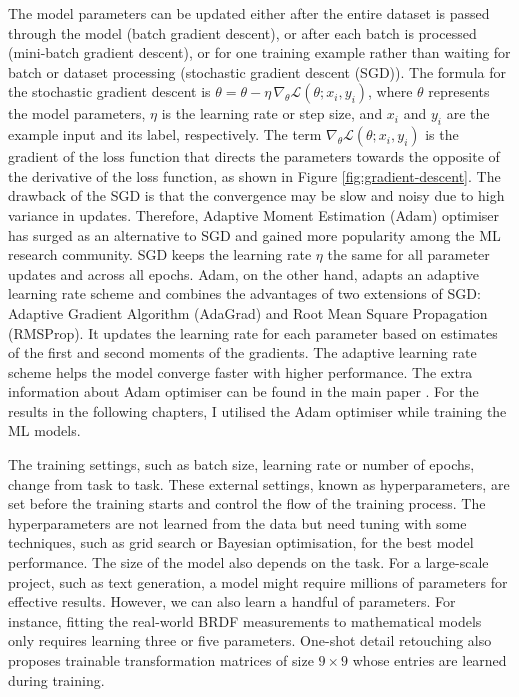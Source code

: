 The model parameters can be updated either after the entire dataset is passed through the model (batch gradient descent), or after each batch is processed (mini-batch gradient descent), or for one training example rather than waiting for batch or dataset processing (stochastic gradient descent (\gls{SGD})). The formula for the stochastic gradient descent is $\theta = \theta - \eta \, \nabla_{\theta} \mathcal{L}(\theta; x_i, y_i)$, where $\theta$ represents the model parameters, $\eta$ is the learning rate or step size, and $x_i$ and $y_i$ are the example input and its label, respectively. The term $\nabla_{\theta} \mathcal{L}(\theta; x_i, y_i)$ is the gradient of the loss function that directs the parameters towards the opposite of the derivative of the loss function, as shown in Figure \ref{fig:gradient-descent}. The drawback of the \gls{SGD} is that the convergence may be slow and noisy due to high variance in updates. Therefore, Adaptive Moment Estimation (\gls{Adam}) optimiser has surged as an alternative to SGD and gained more popularity among the \gls{ML} research community. \gls{SGD} keeps the learning rate $\eta$ the same for all parameter updates and across all epochs. \gls{Adam}, on the other hand,  adapts an adaptive learning rate scheme and combines the advantages of two extensions of \gls{SGD}: Adaptive Gradient Algorithm (AdaGrad) and Root Mean Square Propagation (RMSProp). It updates the learning rate for each parameter based on estimates of the first and second moments of the gradients. The adaptive learning rate scheme helps the model converge faster with higher performance. The extra information about \gls{Adam} optimiser can be found in the main paper \cite{kingma2014adam}. For the results in the following chapters, I utilised the \gls{Adam} optimiser while training the \gls{ML} models.

The training settings, such as batch size, learning rate or number of epochs, change from task to task. These external settings, known as hyperparameters, are set before the training starts and control the flow of the training process. The hyperparameters are not learned from the data but need tuning with some techniques, such as grid search or Bayesian optimisation, for the best model performance. The size of the model also depends on the task. For a large-scale project, such as text generation, a model might require millions of parameters for effective results. However, we can also learn a handful of parameters. For instance, fitting the real-world \gls{BRDF} measurements to mathematical models only requires learning three or five parameters. One-shot detail retouching also proposes trainable transformation matrices of size $9 \times 9$ whose entries are learned during training.

